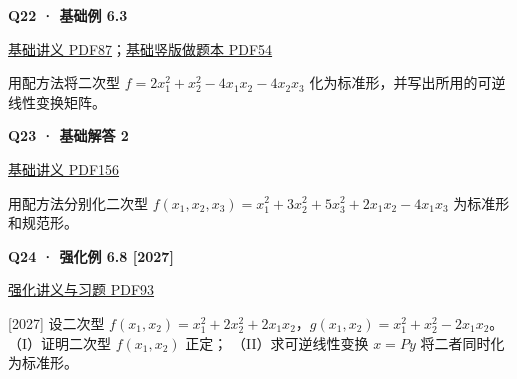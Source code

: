 \documentclass[UTF8,fontset=fandol,11pt,a4paper]{ctexart}
\newcommand{\source}[1]{{\footnotesize\color{Muted}#1\par}}
\newcommand{\qtitle}[2]{\par\needspace{5\baselineskip}\hypertarget{#1}{}\label{#1}\textbf{#2}\par}
\begin{document}
\begin{minipage}{\linewidth}
\qtitle{B-EX-03}{Q22 · 基础例 6.3}
\source{\href{file:///Users/skyintelligence/Desktop/\%E5\%BE\%97\%E8\%AF\%BB\%E4\%B8\%AA\%E7\%A0\%94-\%E5\%8C\%97\%E5\%A4\%A7\%E8\%BD\%AF\%E5\%BE\%AE/\%E6\%95\%B0\%E5\%AD\%A6\%20150/\%E8\%AE\%B2\%E4\%B9\%89/\%E3\%80\%90\%E4\%B8\%80\%E9\%AB\%98\%E6\%95\%B0Kira\%E3\%80\%9127\%E8\%80\%83\%E7\%A0\%94\%E7\%BA\%BF\%E4\%BB\%A3\%E5\%9F\%BA\%E7\%A1\%80\%E8\%AE\%B2\%E4\%B9\%89\%26\%E4\%B9\%A0\%E9\%A2\%98-\%E7\%94\%B5\%E5\%AD\%90\%E7\%89\%88.pdf\#page=87}{基础讲义 PDF87}；\href{file:///Users/skyintelligence/Desktop/\%E5\%BE\%97\%E8\%AF\%BB\%E4\%B8\%AA\%E7\%A0\%94-\%E5\%8C\%97\%E5\%A4\%A7\%E8\%BD\%AF\%E5\%BE\%AE/\%E6\%95\%B0\%E5\%AD\%A6\%20150/\%E8\%AE\%B2\%E4\%B9\%89/\%E3\%80\%90\%E7\%AB\%96\%E7\%89\%88\%E3\%80\%9127\%E8\%80\%83\%E7\%A0\%94Kira\%E7\%BA\%BF\%E4\%BB\%A3\%E5\%9F\%BA\%E7\%A1\%80\%E8\%AE\%B2\%E4\%B9\%89\%E5\%81\%9A\%E9\%A2\%98\%E6\%9C\%AC\%281\%29.pdf\#page=54}{基础竖版做题本 PDF54}}
用配方法将二次型 $f=2x_1^2+x_2^2-4x_1x_2-4x_2x_3$ 化为标准形，并写出所用的可逆线性变换矩阵。
\end{minipage}\par\vspace{7mm}
\begin{minipage}{\linewidth}
\qtitle{B-SA-02}{Q23 · 基础解答 2}
\source{\href{file:///Users/skyintelligence/Desktop/\%E5\%BE\%97\%E8\%AF\%BB\%E4\%B8\%AA\%E7\%A0\%94-\%E5\%8C\%97\%E5\%A4\%A7\%E8\%BD\%AF\%E5\%BE\%AE/\%E6\%95\%B0\%E5\%AD\%A6\%20150/\%E8\%AE\%B2\%E4\%B9\%89/\%E3\%80\%90\%E4\%B8\%80\%E9\%AB\%98\%E6\%95\%B0Kira\%E3\%80\%9127\%E8\%80\%83\%E7\%A0\%94\%E7\%BA\%BF\%E4\%BB\%A3\%E5\%9F\%BA\%E7\%A1\%80\%E8\%AE\%B2\%E4\%B9\%89\%26\%E4\%B9\%A0\%E9\%A2\%98-\%E7\%94\%B5\%E5\%AD\%90\%E7\%89\%88.pdf\#page=156}{基础讲义 PDF156}}
用配方法分别化二次型 $f(x_1,x_2,x_3)=x_1^2+3x_2^2+5x_3^2+2x_1x_2-4x_1x_3$ 为标准形和规范形。
\end{minipage}\par\vspace{7mm}
\begin{minipage}{\linewidth}
\qtitle{R-EX-08}{Q24 · 强化例 6.8 [2027]}
\source{\href{file:///Users/skyintelligence/Desktop/\%E5\%BE\%97\%E8\%AF\%BB\%E4\%B8\%AA\%E7\%A0\%94-\%E5\%8C\%97\%E5\%A4\%A7\%E8\%BD\%AF\%E5\%BE\%AE/\%E6\%95\%B0\%E5\%AD\%A6\%20150/Kira\%C2\%B727\%E7\%BA\%BF\%E6\%80\%A7\%E4\%BB\%A3\%E6\%95\%B0\%E5\%BC\%BA\%E5\%8C\%96\%E8\%AE\%B2\%E4\%B9\%89\%2B\%E4\%B9\%A0\%E9\%A2\%98.pdf\#page=93}{强化讲义与习题 PDF93}}
[2027] 设二次型 $f(x_1,x_2)=x_1^2+2x_2^2+2x_1x_2$，$g(x_1,x_2)=x_1^2+x_2^2-2x_1x_2$。
（I）证明二次型 $f(x_1,x_2)$ 正定；
（II）求可逆线性变换 $x=Py$ 将二者同时化为标准形。
\end{minipage}\par\vspace{7mm}
\end{document}
